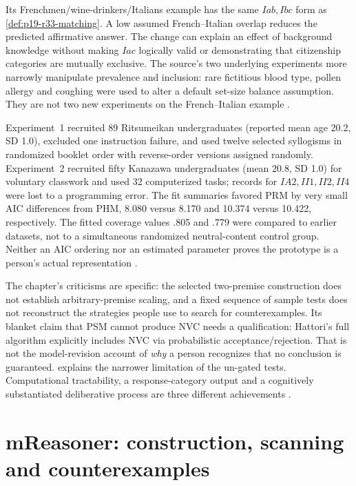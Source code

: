 Its Frenchmen/wine-drinkers/Italians example has the same \(Iab,Ibc\)
form as \cref{def:p19-r33-matching}. A low assumed French--Italian overlap
reduces the predicted affirmative answer. The change can explain an effect
of background knowledge without making \(Iac\) logically valid or
demonstrating that citizenship categories are mutually exclusive.
The source's two underlying experiments more narrowly manipulate prevalence
and inclusion: rare fictitious blood type, pollen allergy and coughing
were used to alter a default set-size balance assumption. They are not
two new experiments on the French--Italian example
\cite[p.~230]{Khemlani2021Syllogistic}
\cite[pp.~313--314]{Hattori2016PRM}.

Experiment~1 recruited 89 Ritsumeikan undergraduates (reported mean age
20.2, SD 1.0), excluded one instruction failure, and used twelve selected
syllogisms in randomized booklet order with reverse-order versions assigned
randomly. Experiment~2 recruited fifty Kanazawa undergraduates (mean 20.8,
SD 1.0) for voluntary classwork and used 32 computerized tasks; records for
\(IA2,II1,II2,II4\) were lost to a programming error. The fit summaries favored
PRM by very small AIC differences from PHM, 8.080 versus 8.170 and 10.374
versus 10.422, respectively. The fitted coverage values .805 and .779 were
compared to earlier datasets, not to a simultaneous randomized neutral-content
control group. Neither an AIC ordering nor an estimated parameter proves
the prototype is a person's actual representation
\cite[pp.~313--315, Tables~5--6]{Hattori2016PRM}.

The chapter's criticisms are specific: the selected two-premise construction
does not establish arbitrary-premise scaling, and a fixed sequence of sample
tests does not reconstruct the strategies people use to search for
counterexamples. Its blanket claim that PSM cannot produce NVC needs a
qualification: Hattori's full algorithm explicitly includes NVC via
probabilistic acceptance/rejection. That is not the model-revision account
of \emph{why} a person recognizes that no conclusion is guaranteed.
 explains the narrower limitation of the
un-gated tests. Computational tractability, a response-category output and
a cognitively substantiated deliberative process are three different
achievements \cite[p.~230]{Khemlani2021Syllogistic}
\cite[p.~304, Figure~8]{Hattori2016PRM}.

\section{mReasoner: construction, scanning and counterexamples}
\label{sec:p19-r33-mreasoner}


